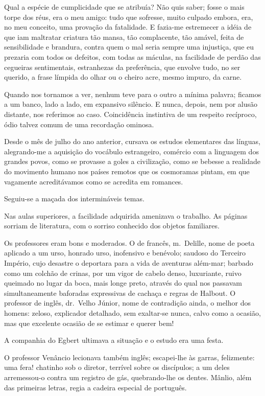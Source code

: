 Qual a espécie de cumplicidade que se atribuía? Não quis saber; fosse o mais
torpe dos réus, era o meu amigo: tudo que sofresse, muito culpado
embora, era, no meu conceito, uma provação da fatalidade. E fazia{}-me
estremecer a idéia de que iam maltratar criatura tão mansa, tão
complacente, tão amável, feita de sensibilidade e brandura, contra quem
o mal seria sempre uma injustiça, que eu prezaria com todos os
defeitos, com todas as máculas, na facilidade de perdão das cegueiras
sentimentais, estranhezas da preferência, que envolve tudo, no ser
querido, a frase límpida do olhar ou o cheiro acre, mesmo impuro, da
carne. 

Quando nos tornamos a ver, nenhum teve para o outro a mínima
palavra; ficamos a um banco, lado a lado, em expansivo silêncio. E
nunca, depois, nem por alusão distante, nos referimos ao caso.
Coincidência instintiva de um respeito recíproco, ódio talvez comum de
uma recordação ominosa. 

Desde o mês de julho do ano anterior, cursava
os estudos elementares das línguas, alegrando{}-me a aquisição do
vocábulo estrangeiro, comércio com a linguagem dos grandes povos, como
se provasse a goles a civilização, como se bebesse a realidade do
movimento humano nos países remotos que os cosmoramas pintam, em que
vagamente acreditávamos como se acredita em romances. 

Seguiu{}-se a maçada dos intermináveis temas. 

Nas aulas superiores, a facilidade
adquirida amenizava o trabalho. As páginas sorriam de literatura, com o
sorriso conhecido dos objetos familiares.

Os professores eram bons e moderados. O de francês, m.~Delille, nome de
poeta aplicado a um urso, honrado urso, inofensivo e benévolo; saudoso
do Terceiro Império, cujo desastre o deportara para a vida de aventuras
além{}-mar; barbado como um colchão de crinas, por um vigor de cabelo
denso, luxuriante, ruivo queimado no lugar da boca, mais longe preto,
através do qual nos passavam simultaneamente baforadas expressivas de
cachaça e regras de Halbout. O professor de inglês, dr.~Velho Júnior,
nome de contradição ainda, o melhor dos homens: zeloso, explicador
detalhado, sem exaltar{}-se nunca, calvo como a ocasião, mas que
excelente ocasião de se estimar e querer bem! 

A companhia do Egbert ultimava a situação e o estudo era uma festa. 

O professor Venâncio
lecionava também inglês; escapei{}-lhe às garras, felizmente: uma fera!
chatinho sob o diretor, terrível sobre os discípulos; a um deles
arremessou{}-o contra um registro de gás, quebrando{}-lhe os dentes.
Mânlio, além das primeiras letras, regia a cadeira especial de
português. 

